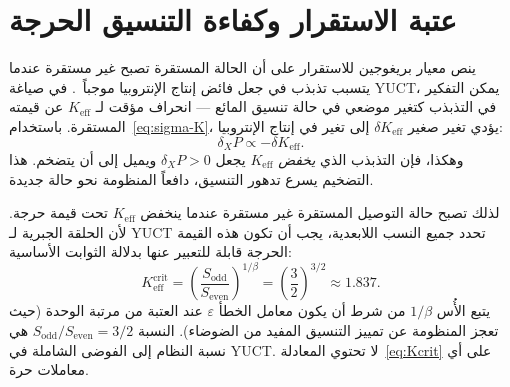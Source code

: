 \documentclass[12pt,a4paper]{article}
\begin{document}
	\section{عتبة الاستقرار وكفاءة التنسيق الحرجة}
	ينص معيار بريغوجين للاستقرار على أن الحالة المستقرة تصبح غير مستقرة عندما يتسبب تذبذب في جعل فائض إنتاج الإنتروبيا موجباً~\cite{Glansdorff1971}. في صياغة YUCT، يمكن التفكير في التذبذب كتغير موضعي في حالة تنسيق المائع — انحراف مؤقت لـ \(K_{\mathrm{eff}}\) عن قيمته المستقرة. باستخدام~\eqref{eq:sigma-K}، يؤدي تغير صغير \(\delta K_{\mathrm{eff}}\) إلى تغير في إنتاج الإنتروبيا:
	\begin{equation}
		\delta_X P \propto - \delta K_{\mathrm{eff}}.
	\end{equation}
	وهكذا، فإن التذبذب الذي \emph{يخفض} \(K_{\mathrm{eff}}\) يجعل \(\delta_X P > 0\) ويميل إلى أن يتضخم. هذا التضخيم يسرع تدهور التنسيق، دافعاً المنظومة نحو حالة جديدة.
	
	لذلك تصبح حالة التوصيل المستقرة غير مستقرة عندما ينخفض \(K_{\mathrm{eff}}\) تحت قيمة حرجة. لأن الحلقة الجبرية لـ YUCT تحدد جميع النسب اللابعدية، يجب أن تكون هذه القيمة الحرجة قابلة للتعبير عنها بدلالة الثوابت الأساسية:
	\begin{equation}\label{eq:Kcrit}
		K_{\mathrm{eff}}^{\mathrm{crit}} = \left( \frac{S_{\mathrm{odd}}}{S_{\mathrm{even}}} \right)^{1/\beta}
		= \left( \frac{3}{2} \right)^{3/2} \approx 1.837.
	\end{equation}
	يتبع الأُس \(1/\beta\) من شرط أن يكون معامل الخطأ \(\varepsilon\) عند العتبة من مرتبة الوحدة (حيث تعجز المنظومة عن تمييز التنسيق المفيد من الضوضاء). النسبة \(S_{\mathrm{odd}}/S_{\mathrm{even}} = 3/2\) هي نسبة النظام إلى الفوضى الشاملة في YUCT. لا تحتوي المعادلة~\eqref{eq:Kcrit} على أي معاملات حرة.
	
\end{document}
